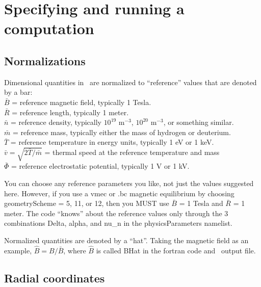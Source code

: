 \chapter{Specifying and running a computation}

\section{Normalizations}
\label{sec:normalizations}

{\setlength{\parindent}{0cm}
Dimensional quantities in \sfincs~are normalized to ``reference'' values that are denoted by a bar:\\
$\bar{B}$ = reference magnetic field, typically 1 Tesla.\\
$\bar{R}$ = reference length, typically 1 meter.\\
$\bar{n}$ = reference density, typically $10^{19}$ m$^{-3}$, $10^{20}$ m$^{-3}$, or something similar.\\
$\bar{m}$ = reference mass, typically either the mass of hydrogen or deuterium.\\
$\bar{T}$ = reference temperature in energy units, typically 1 eV or 1 keV.\\
$\bar{v} = \sqrt{2 \bar{T} / \bar{m}}$ = thermal speed at the reference temperature and mass\\
$\bar{\Phi}$ = reference electrostatic potential, typically 1 V or 1 kV.\\
}

You can choose any reference parameters you like, not just the values
suggested here. However, if you use a {\ttfamily vmec} or {\ttfamily .bc} magnetic equilibrium
by choosing {\ttfamily geometryScheme} = 5, 11, or 12, then you MUST use $\bar{B}$ = 1 Tesla and $\bar{R}$ = 1 meter.
The code ``knows'' about the reference values only through
the 3 combinations {\ttfamily Delta}, {\ttfamily alpha}, and {\ttfamily nu\_n}
in the {\ttfamily physicsParameters} namelist.

Normalized quantities are denoted by a ``hat''.  Taking the magnetic field as an example,
$\hat{B}=B/\bar{B}$, where $\hat{B}$ is called {\ttfamily BHat} in the fortran code and \HDF~output file.

\section{Radial coordinates}
\label{sec:radialCoordinates}

